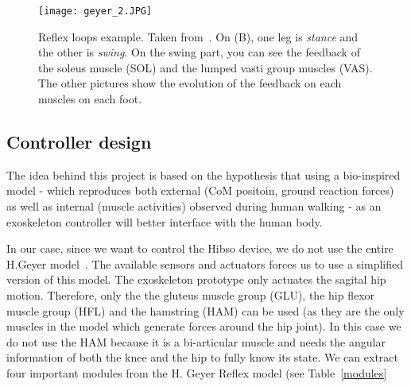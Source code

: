 \documentclass[a4paper,12pt]{article}
\begin{document}
\begin{figure}[H]
	\centering
    \texttt{[image: geyer\_2.JPG]}
    \label{geyer_2}
    \caption{Reflex loops example. Taken from~\cite{geyer2010muscle}. On (B), one leg is \textit{stance} and the other is \textit{swing}. On the swing part, you can see the feedback of the soleus muscle (SOL) and the lumped vasti group muscles (VAS). The other pictures show the evolution of the feedback on each muscles on each foot.}
\end{figure}

\subsection{Controller design} \label{controller_design}
The idea behind this project is based on the hypothesis that using a bio-inspired model - which reproduces both external (CoM positoin, ground reaction forces) as well as internal (muscle activities) observed during human walking - as an exoskeleton controller will better interface with the human body. 

In our case, since we want to control the Hibso device, we do not use the entire H.Geyer model~\cite{geyer2010muscle}. The available sensors and actuators forces us to use a simplified version of this model. 
\label{controllerdesign}
\medbreak
The exoskeleton prototype only actuates the sagital hip motion. Therefore, only the the gluteus muscle group (GLU), the hip flexor muscle group (HFL) and the hamstring (HAM) can be used (as they are the only muscles in the model which generate forces around the hip joint). In this case we do not use the HAM because it is a bi-articular muscle and needs the angular information of both the knee and the hip to fully know its state.
\label{HAM}
\medbreak
We can extract four important modules from the H. Geyer Reflex model (see Table~\ref{modules} 
\end{document}
